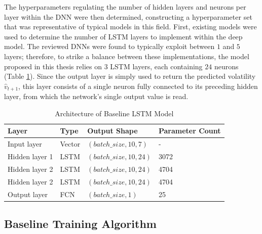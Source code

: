 \documentclass[a4paper, 11pt]{report}
\begin{document}
    The hyperparameters regulating the number of hidden layers and neurons per layer within the DNN were then determined, constructing a hyperparameter set that was representative of typical models in this field. First, existing models were used to determine the number of LSTM layers to implement within the deep model. The reviewed DNNs were found to typically exploit between $1$ \citep{bucci-2020} and $5$ \citep{kim-2018} layers; therefore, to strike a balance between these implementations, the model proposed in this thesis relies on $3$ LSTM layers, each containing $24$ neurons (Table \ref{table: architecture}). Since the output layer is simply used to return the predicted volatility $\hat{v}_{t+1}$, this layer consists of a single neuron fully connected to its preceding hidden layer, from which the network's single output value is read.


    \begin{table}[ht]
        \centering
        \begin{tabular}{|l|l|l|l|} 
        \hline
        \textbf{Layer} & \textbf{Type} & \textbf{Output Shape}   & \textbf{Parameter Count}  \\ 
        \hline
        Input layer    & Vector        & $(batch\_size, 10, 7)$  & -                         \\ 
        \hline
        Hidden layer 1 & LSTM          & $(batch\_size, 10, 24)$ & 3072                      \\ 
        \hline
        Hidden layer 2 & LSTM          & $(batch\_size, 10, 24)$ & 4704                      \\ 
        \hline
        Hidden layer 2 & LSTM          & $(batch\_size, 10, 24)$ & 4704                      \\ 
        \hline
        Output layer   & FCN           & $(batch\_size, 1)$      & 25                        \\
        \hline
        \end{tabular}
        \caption{\centering Architecture of Baseline LSTM Model}
        \label{table: architecture}
    \end{table}

    \subsection{Baseline Training Algorithm}
\end{document}
